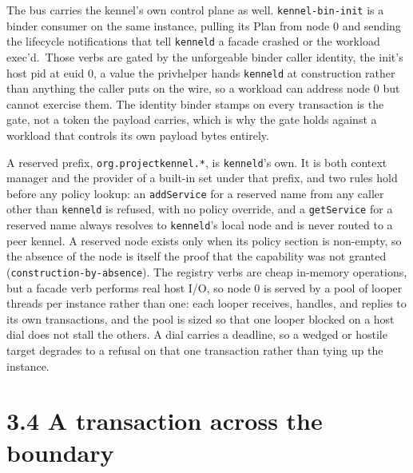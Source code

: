 The bus carries the kennel's own control plane as well.
\texttt{kennel-bin-init} is a binder consumer on the same instance,
pulling its Plan from node 0 and sending the lifecycle notifications
that tell \texttt{kenneld} a facade crashed or the workload
exec'd.~Those verbs are gated by the unforgeable binder caller identity,
the init's host pid at euid 0, a value the privhelper hands
\texttt{kenneld} at construction rather than anything the caller puts on
the wire, so a workload can address node 0 but cannot exercise them. The
identity binder stamps on every transaction is the gate, not a token the
payload carries, which is why the gate holds against a workload that
controls its own payload bytes entirely.

A reserved prefix, \texttt{org.projectkennel.*}, is \texttt{kenneld}'s
own. It is both context manager and the provider of a built-in set under
that prefix, and two rules hold before any policy lookup: an
\texttt{addService} for a reserved name from any caller other than
\texttt{kenneld} is refused, with no policy override, and a
\texttt{getService} for a reserved name always resolves to
\texttt{kenneld}'s local node and is never routed to a peer kennel. A
reserved node exists only when its policy section is non-empty, so the
absence of the node is itself the proof that the capability was not
granted (\texttt{construction-by-absence}). The registry verbs are cheap
in-memory operations, but a facade verb performs real host I/O, so node
0 is served by a pool of looper threads per instance rather than one:
each looper receives, handles, and replies to its own transactions, and
the pool is sized so that one looper blocked on a host dial does not
stall the others. A dial carries a deadline, so a wedged or hostile
target degrades to a refusal on that one transaction rather than tying
up the instance.

\hypertarget{a-transaction-across-the-boundary}{%
\section{3.4 A transaction across the
boundary}\label{a-transaction-across-the-boundary}}

